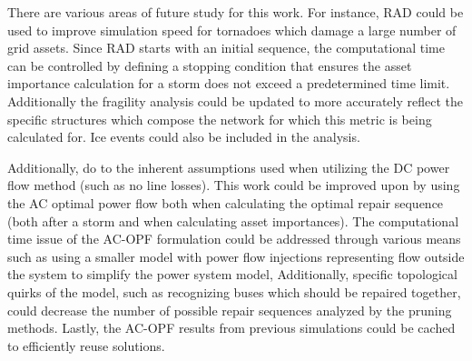 \documentclass[12pt]{article}
\begin{document}
There are various areas of future study for this work. For instance, RAD could be used to improve simulation speed for tornadoes which damage a large number of grid assets. Since RAD starts with an initial sequence, the computational time can be controlled by defining a stopping condition that ensures the asset importance calculation for a storm does not exceed a predetermined time limit. Additionally the fragility analysis could be updated to more accurately reflect the specific structures which compose the network for which this metric is being calculated for. Ice events could also be included in the analysis. \par
Additionally, do to the inherent assumptions used when utilizing the DC power flow method (such as no line losses). This work could be improved upon by using the AC optimal power flow both when calculating the optimal repair sequence (both after a storm and when calculating asset importances). The computational time issue of the AC-OPF formulation could be addressed through various means such as using a smaller model with power flow injections representing flow outside the system to simplify the power system model, Additionally, specific topological quirks of the model, such as recognizing buses which should be repaired together, could decrease the number of possible repair sequences analyzed by the pruning methods. Lastly, the AC-OPF results from previous simulations could be cached to efficiently reuse solutions.





\newpage

\newpage 
\appendix 
\end{document}
